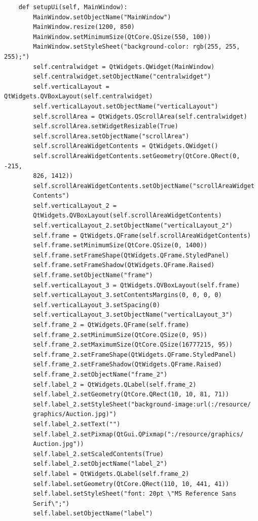 \documentclass[12pt]{article}
\begin{document}
\begin{verbatim}
    def setupUi(self, MainWindow):
        MainWindow.setObjectName("MainWindow")
        MainWindow.resize(1200, 850)
        MainWindow.setMinimumSize(QtCore.QSize(550, 100))
        MainWindow.setStyleSheet("background-color: rgb(255, 255, 255);")
        self.centralwidget = QtWidgets.QWidget(MainWindow)
        self.centralwidget.setObjectName("centralwidget")
        self.verticalLayout = QtWidgets.QVBoxLayout(self.centralwidget)
        self.verticalLayout.setObjectName("verticalLayout")
        self.scrollArea = QtWidgets.QScrollArea(self.centralwidget)
        self.scrollArea.setWidgetResizable(True)
        self.scrollArea.setObjectName("scrollArea")
        self.scrollAreaWidgetContents = QtWidgets.QWidget()
        self.scrollAreaWidgetContents.setGeometry(QtCore.QRect(0, -215,
        826, 1412))
        self.scrollAreaWidgetContents.setObjectName("scrollAreaWidget
        Contents")
        self.verticalLayout_2 =
        QtWidgets.QVBoxLayout(self.scrollAreaWidgetContents)
        self.verticalLayout_2.setObjectName("verticalLayout_2")
        self.frame = QtWidgets.QFrame(self.scrollAreaWidgetContents)
        self.frame.setMinimumSize(QtCore.QSize(0, 1400))
        self.frame.setFrameShape(QtWidgets.QFrame.StyledPanel)
        self.frame.setFrameShadow(QtWidgets.QFrame.Raised)
        self.frame.setObjectName("frame")
        self.verticalLayout_3 = QtWidgets.QVBoxLayout(self.frame)
        self.verticalLayout_3.setContentsMargins(0, 0, 0, 0)
        self.verticalLayout_3.setSpacing(0)
        self.verticalLayout_3.setObjectName("verticalLayout_3")
        self.frame_2 = QtWidgets.QFrame(self.frame)
        self.frame_2.setMinimumSize(QtCore.QSize(0, 95))
        self.frame_2.setMaximumSize(QtCore.QSize(16777215, 95))
        self.frame_2.setFrameShape(QtWidgets.QFrame.StyledPanel)
        self.frame_2.setFrameShadow(QtWidgets.QFrame.Raised)
        self.frame_2.setObjectName("frame_2")
        self.label_2 = QtWidgets.QLabel(self.frame_2)
        self.label_2.setGeometry(QtCore.QRect(10, 10, 81, 71))
        self.label_2.setStyleSheet("background-image:url(:/resource/
        graphics/Auction.jpg)")
        self.label_2.setText("")
        self.label_2.setPixmap(QtGui.QPixmap(":/resource/graphics/
        Auction.jpg"))
        self.label_2.setScaledContents(True)
        self.label_2.setObjectName("label_2")
        self.label = QtWidgets.QLabel(self.frame_2)
        self.label.setGeometry(QtCore.QRect(110, 10, 441, 41))
        self.label.setStyleSheet("font: 20pt \"MS Reference Sans
        Serif\";")
        self.label.setObjectName("label")

\end{verbatim}
\end{document}
